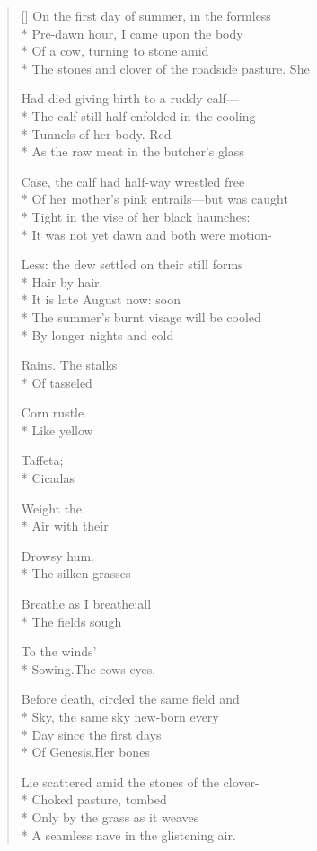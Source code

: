 \label{ch:another_creation_myth}
\settowidth{\versewidth}{The stones and clover of the roadside pasture. She}
\begin{verse}[\versewidth]
On the first day of summer, in the formless\\*
Pre-dawn hour, I came upon the body\\*
Of a cow, turning to stone amid\\*
The stones and clover of the roadside pasture. She

Had died giving birth to a ruddy calf---\\*
The calf still half-enfolded in the cooling\\*
Tunnels of her body.     Red\\*
As the raw meat in the butcher's glass

Case, the calf had half-way wrestled free\\*
Of her mother's pink entrails---but was caught\\*
Tight in the vise of her black haunches:\\*
It was not yet dawn and both were motion-

Less:  the dew settled on their still forms\\*
Hair by hair. \\*
 It is late August now: soon \\*
The summer's burnt visage will be cooled\\*
By longer nights and cold

Rains.  The stalks\\*
Of tasseled

Corn rustle\\*
Like yellow

Taffeta;\\*
Cicadas

Weight the\\*
Air with their

Drowsy hum.\\*
The silken grasses

Breathe as I breathe:\qquad all\\*
The fields sough

To the winds'\\*
Sowing.\qquad The cows eyes,

Before death, circled the same field and\\*
Sky, the same sky new-born every\\*
Day since the first days\\*
Of Genesis.\qquad Her bones

Lie scattered amid the stones of the clover-\\*
Choked pasture, tombed\\*
Only by the grass as it weaves\\*
A seamless nave in the glistening air.
\end{verse}
